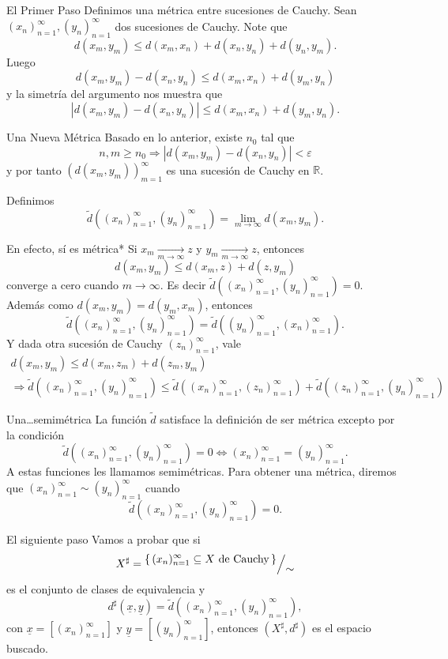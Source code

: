 \documentclass[utf8]{beamer}
\theoremstyle{plain}
\theoremstyle{definition}
\theoremstyle{remark}
\numberwithin{equation}{section}
\newcommand{\eps}{\varepsilon}          %
\newcommand{\bR}{\mathbb{R}}    %
\newcommand{\set}[1]{\{\,#1\,\}}    %
\newcommand\quot[2]{
        \mathchoice
            {%
                \text{\raise1ex\hbox{$#1$}\Big/\lower1ex\hbox{$#2$}}%
            }
            {%
                {^{ #1}/_{ #2}}
            }
            {%
                {^{ #1}/_{ #2}}
            }
            {%
                {^{ #1}/_{ #2}}
            }
    }
\renewcommand{\geq}{\geqslant}          %
\renewcommand{\leq}{\leqslant}          %
\newcommand{\To}{\Rightarrow}
\newcommand{\un}{\underline}
\newcommand{\sucn}{_{n=1}^\infty} %
\begin{document}
\begin{frame}{El Primer Paso}
  Definimos una métrica entre sucesiones de Cauchy. Sean $(x_n)\sucn,(y_n)\sucn$ dos sucesiones de Cauchy. Note que 
  $$d(x_m,y_m)\leq d(x_m,x_n)+d(x_n,y_n)+d(y_n,y_m).$$
  Luego 
  $$d(x_m,y_m)-d(x_n,y_n)\leq d(x_m,x_n)+d(y_m,y_n)$$
  y la simetría del argumento nos muestra que 
  $$|d(x_m,y_m)-d(x_n,y_n)|\leq d(x_m,x_n)+d(y_m,y_n).$$
  
  \end{frame}

  \begin{frame}{Una Nueva Métrica}
    Basado en lo anterior, existe $n_0$ tal que 
    $$n,m\geq n_0\To |d(x_m,y_m)-d(x_n,y_n)|<\eps$$
    y por tanto $(d(x_m,y_m))_{m=1}^\infty$ es una sucesión de Cauchy en $\bR$.\par 
    Definimos 
    $$\tilde{d}((x_n)\sucn,(y_n)\sucn)=\lim_{m\to\infty}d(x_m,y_m).$$
    
  \end{frame}

  \begin{frame}{En efecto, sí es métrica*}
    Si $x_m\xrightarrow[m\to\infty]{}z$ y $y_m\xrightarrow[m\to\infty]{}z$, entonces
    $$d(x_m,y_m)\leq d(x_m,z)+d(z,y_m)$$ converge a cero cuando $m\to\infty$. Es decir $\tilde{d}((x_n)\sucn,(y_n)\sucn)=0$. Además como $d(x_m,y_m)=d(y_m,x_m)$, entonces 
    $$\tilde{d}((x_n)\sucn,(y_n)\sucn)=\tilde{d}((y_n)\sucn,(x_n)\sucn).$$
    Y dada otra sucesión de Cauchy $(z_n)\sucn$, vale 
    \begin{gather*}
    d(x_m,y_m)\leq d(x_m,z_m)+d(z_m,y_m)\\
    \To \tilde{d}((x_n)\sucn,(y_n)\sucn)\leq \tilde{d}((x_n)\sucn,(z_n)\sucn)+\tilde{d}((z_n)\sucn,(y_n)\sucn)
    \end{gather*} 
    
  \end{frame}

  \begin{frame}{Una\dots semimétrica}
    La función $\tilde{d}$ satisface la definición de ser métrica excepto por la condición 
    $$\tilde{d}((x_n)\sucn,(y_n)\sucn)=0\iff (x_n)\sucn=(y_n)\sucn.$$
     A estas funciones les llamamos \alert{semimétricas}. Para obtener una métrica, diremos que $(x_n)\sucn\sim(y_n)\sucn$ cuando 
     $$\tilde{d}((x_n)\sucn,(y_n)\sucn)=0.$$
     
  \end{frame}
\begin{frame}{El siguiente paso}
  Vamos a probar que si
     $$X^\sharp=\quot{\set{(x_n)\sucn\subseteq X\ \text{de Cauchy}}}{\sim}$$
     es el conjunto de clases de equivalencia y 
     $$d^\sharp(\un x,\un y)=\tilde{d}((x_n)\sucn,(y_n)\sucn),$$
     con $\un x=[(x_n)\sucn]$ y $\un y=[(y_n)\sucn]$, entonces $(X^\sharp,d^\sharp)$ es el espacio buscado.
\end{frame}
\end{document}
